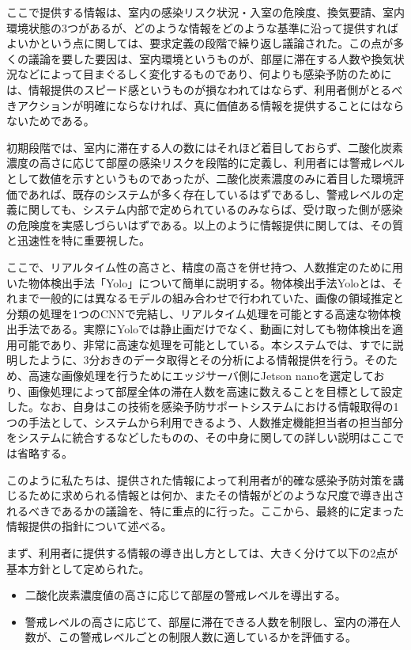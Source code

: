 ここで提供する情報は、室内の感染リスク状況・入室の危険度、換気要請、室内環境状態の3つがあるが、どのような情報をどのような基準に沿って提供すればよいかという点に関しては、要求定義の段階で繰り返し議論された。この点が多くの議論を要した要因は、室内環境というものが、部屋に滞在する人数や換気状況などによって目まぐるしく変化するものであり、何よりも感染予防のためには、情報提供のスピード感というものが損なわれてはならず、利用者側がとるべきアクションが明確にならなければ、真に価値ある情報を提供することにはならないためである。

初期段階では、室内に滞在する人の数にはそれほど着目しておらず、二酸化炭素濃度の高さに応じて部屋の感染リスクを段階的に定義し、利用者には警戒レベルとして数値を示すというものであったが、二酸化炭素濃度のみに着目した環境評価であれば、既存のシステムが多く存在しているはずであるし、警戒レベルの定義に関しても、システム内部で定められているのみならば、受け取った側が感染の危険度を実感しづらいはずである。以上のように情報提供に関しては、その質と迅速性を特に重要視した。

ここで、リアルタイム性の高さと、精度の高さを併せ持つ、人数推定のために用いた物体検出手法「Yolo」について簡単に説明する。物体検出手法Yoloとは、それまで一般的には異なるモデルの組み合わせで行われていた、画像の領域推定と分類の処理を1つのCNNで完結し、リアルタイム処理を可能とする高速な物体検出手法である。実際にYoloでは静止画だけでなく、動画に対しても物体検出を適用可能であり、非常に高速な処理を可能としている。本システムでは、すでに説明したように、3分おきのデータ取得とその分析による情報提供を行う。そのため、高速な画像処理を行うためにエッジサーバ側にJetson nanoを選定しており、画像処理によって部屋全体の滞在人数を高速に数えることを目標として設定した。なお、自身はこの技術を感染予防サポートシステムにおける情報取得の1つの手法として、システムから利用できるよう、人数推定機能担当者の担当部分をシステムに統合するなどしたものの、その中身に関しての詳しい説明はここでは省略する。

このように私たちは、提供された情報によって利用者が的確な感染予防対策を講じるために求められる情報とは何か、またその情報がどのような尺度で導き出されるべきであるかの議論を、特に重点的に行った。ここから、最終的に定まった情報提供の指針について述べる。

まず、利用者に提供する情報の導き出し方としては、大きく分けて以下の2点が基本方針として定められた。

\begin{itemize}
	\item 二酸化炭素濃度値の高さに応じて部屋の警戒レベルを導出する。
	\item 警戒レベルの高さに応じて、部屋に滞在できる人数を制限し、室内の滞在人数が、この警戒レベルごとの制限人数に適しているかを評価する。
\end{itemize}

